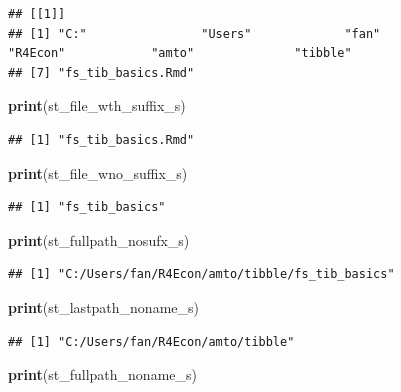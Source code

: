 \documentclass[
]{book}
\newenvironment{Shaded}{\begin{snugshade}}{\end{snugshade}}
\newcommand{\KeywordTok}[1]{\textcolor[rgb]{0.13,0.29,0.53}{\textbf{#1}}}
\newcommand{\NormalTok}[1]{#1}
\begin{document}
\begin{verbatim}
## [[1]]
## [1] "C:"                "Users"             "fan"               "R4Econ"            "amto"              "tibble"           
## [7] "fs_tib_basics.Rmd"
\end{verbatim}

\begin{Shaded}
\begin{Highlighting}[]
\KeywordTok{print}\NormalTok{(st\_file\_wth\_suffix\_s)}
\end{Highlighting}
\end{Shaded}

\begin{verbatim}
## [1] "fs_tib_basics.Rmd"
\end{verbatim}

\begin{Shaded}
\begin{Highlighting}[]
\KeywordTok{print}\NormalTok{(st\_file\_wno\_suffix\_s)}
\end{Highlighting}
\end{Shaded}

\begin{verbatim}
## [1] "fs_tib_basics"
\end{verbatim}

\begin{Shaded}
\begin{Highlighting}[]
\KeywordTok{print}\NormalTok{(st\_fullpath\_nosufx\_s)}
\end{Highlighting}
\end{Shaded}

\begin{verbatim}
## [1] "C:/Users/fan/R4Econ/amto/tibble/fs_tib_basics"
\end{verbatim}

\begin{Shaded}
\begin{Highlighting}[]
\KeywordTok{print}\NormalTok{(st\_lastpath\_noname\_s)}
\end{Highlighting}
\end{Shaded}

\begin{verbatim}
## [1] "C:/Users/fan/R4Econ/amto/tibble"
\end{verbatim}

\begin{Shaded}
\begin{Highlighting}[]
\KeywordTok{print}\NormalTok{(st\_fullpath\_noname\_s)}
\end{Highlighting}
\end{Shaded}
\end{document}
